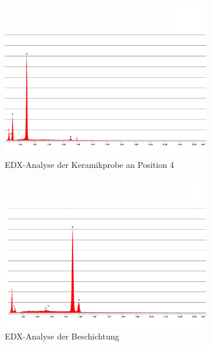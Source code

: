 \documentclass[12pt,english,ngerman]{scrartcl}
\begin{document}
\begin{figure}[H]
	\begin{center}
		\includegraphics[width =0.8\textwidth]{./figures/edx4.png}
	\end{center}
	\caption{EDX-Analyse der Keramikprobe an Position 4 \cite{sein_foto}}
    \label{fig:position4}
\end{figure}

\begin{figure}[H]
	\begin{center}
		\includegraphics[width =0.8\textwidth]{./figures/beschichtung.png}
	\end{center}
	\caption{EDX-Analyse der Beschichtung \cite{sein_foto}}
    \label{fig:beschichtung}
\end{figure}
\end{document}
